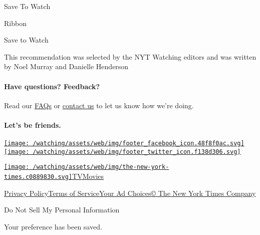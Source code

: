 Save To Watch

Ribbon

Save to Watch

This recommendation was selected by the NYT Watching editors and was
written by Noel Murray and Danielle Henderson

\hypertarget{have-questions-feedback}{%
\paragraph{Have questions? Feedback?}\label{have-questions-feedback}}

Read our
\href{//www.nytimes3xbfgragh.onion/2017/01/10/watching/faq.html}{FAQs}
or \href{mailto:watchingcare@NYTimes.com}{contact us} to let us know how
we're doing.

\hypertarget{lets-be-friends}{%
\paragraph{Let's be friends.}\label{lets-be-friends}}

\href{https://www.facebookcorewwwi.onion/nytwatching/}{\texttt{[image: /watching/assets/web/img/footer\_facebook\_icon.48f8f0ac.svg]}}\href{https://twitter.com/watching}{\texttt{[image: /watching/assets/web/img/footer\_twitter\_icon.f138d306.svg]}}

\href{//www.nytimes3xbfgragh.onion}{\texttt{[image: /watching/assets/web/img/the-new-york-times.c0889830.svg]}}\href{//www.nytimes3xbfgragh.onion/section/arts/television}{TV}\href{//www.nytimes3xbfgragh.onion/section/movies}{Movies}

\href{//www.nytimes3xbfgragh.onion/content/help/rights/privacy/policy/privacy-policy.html}{Privacy
Policy}\href{//www.nytimes3xbfgragh.onion/content/help/rights/terms/terms-of-service.html}{Terms
of
Service}\href{//www.nytimes3xbfgragh.onion/content/help/rights/privacy/policy/privacy-policy.html\#pp}{Your
Ad Choices}\href{http://www.nytco.com/}{© The New York Times Company}

Do Not Sell My Personal Information

Your preference has been saved.
